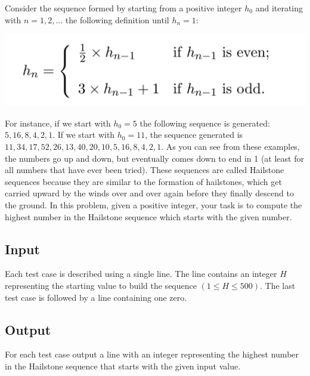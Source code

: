 Consider the sequence formed by starting from a positive integer $h_0$ and
iterating with $n = 1, 2, ...$ the following definition until $h_n = 1$:

\begin{center}
\includegraphics[scale=0.25]{problems/hailstone/imagens/hn.png}
\end{center}

For instance, if we start with $h_0 = 5$ the following sequence is generated: $5,
16, 8, 4, 2, 1$. If we
start with $h_0 = 11$, the sequence generated is $11, 34, 17, 52, 26, 13, 40,
20, 10, 5, 16, 8, 4, 2, 1.$
As you can see from these examples, the numbers go up and down, but
eventually comes down
to end in 1 (at least for all numbers that have ever been tried). These
sequences are called Hailstone
sequences because they are similar to the formation of hailstones, which get
carried upward by the
winds over and over again before they finally descend to the ground.
In this problem, given a positive integer, your task is to compute the
highest number in the
Hailstone sequence which starts with the given number.

\subsection*{Input}

Each test case is described using a single line. The line contains an integer
$H$ representing the starting value to build the sequence $(1 \leq H \leq 500)$.
The last test case is followed by a line containing one zero.

\subsection*{Output}

For each test case output a line with an integer representing the highest number
in the Hailstone sequence that starts with the given input value.

